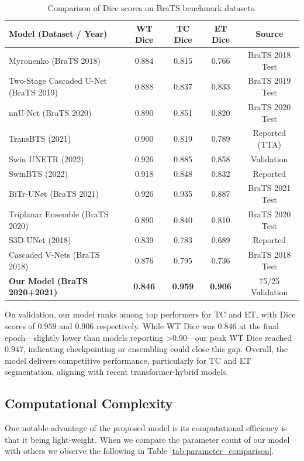 \begin{table}[!htbp]
    \caption{Comparison of Dice scores on BraTS benchmark datasets.}
    \label{tab:brats_comparison}
    \centering
    \begin{tabular}{lcccc}
        \toprule
        Model (Dataset / Year) & WT Dice & TC Dice & ET Dice & Source \\
        \midrule
        Myronenko (BraTS 2018) & 0.884 & 0.815 & 0.766 & BraTS 2018 Test \\
        Two-Stage Cascaded U-Net (BraTS 2019) & 0.888 & 0.837 & 0.833 & BraTS 2019 Test \\
        nnU-Net (BraTS 2020) & 0.890 & 0.851 & 0.820 & BraTS 2020 Test \\
        TransBTS (2021) & 0.900 & 0.819 & 0.789 & Reported (TTA) \\
        Swin UNETR (2022) & 0.926 & 0.885 & 0.858 & Validation \\
        SwinBTS (2022) & 0.918 & 0.848 & 0.832 & Reported \\
        BiTr-UNet (BraTS 2021) & 0.926 & 0.935 & 0.887 & BraTS 2021 Test \\
        Triplanar Ensemble (BraTS 2020) & 0.890 & 0.840 & 0.810 & BraTS 2020 Test \\
        S3D-UNet (2018) & 0.839 & 0.783 & 0.689 & Reported \\
        Cascaded V-Nets (BraTS 2018) & 0.876 & 0.795 & 0.736 & BraTS 2018 Test \\
        \textbf{Our Model (BraTS 2020+2021)} & \textbf{0.846} & \textbf{0.959} & \textbf{0.906} & 75/25 Validation \\
        \bottomrule
    \end{tabular}
\end{table}

On validation, our model ranks among top performers for TC and ET, with Dice scores of $0.959$ and $0.906$ respectively. While WT Dice was $0.846$ at the final epoch—slightly lower than models reporting >0.90—our peak WT Dice reached $0.947$, indicating checkpointing or ensembling could close this gap. Overall, the model delivers competitive performance, particularly for TC and ET segmentation, aligning with recent transformer-hybrid models.

\subsection{Computational Complexity}

One notable advantage of the proposed model is its computational efficiency is that it being light-weight. When we compare the parameter count of our model with others we observe the following in Table \ref{tab:parameter_comparison}.

